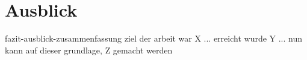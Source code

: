 \chapter{Ausblick}
\label{ausblick}
fazit-ausblick-zusammenfassung
ziel der arbeit war X ... erreicht wurde Y ... nun kann auf dieser grundlage, Z gemacht werden